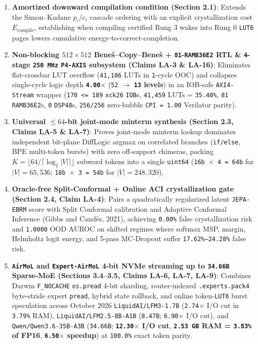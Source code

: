 \documentclass[10pt]{article}
\begin{document}
\begin{enumerate}
  \item \textbf{Amortized downward compilation condition (Section 2.1)}: Extends the Simon--Kadane $p_i / c_i$ cascade ordering with an explicit crystallization cost $E_{\text{compile}}$, establishing when compiling certified Rung 3 wakes into Rung 0 \texttt{LUT6} pages lowers cumulative energy-to-correct-completion.
  \item \textbf{Non-blocking $512 \times 512$ Bene\v{s}--Copy--Bene\v{s} + \texttt{81}-\texttt{RAMB36E2} RTL \& \texttt{4}-stage \texttt{250 MHz} \texttt{P4-AXIS} subsystem (Claims LA-3 \& LA-16)}: Eliminates flat-crossbar LUT overflow (\texttt{41,186} LUTs in \texttt{1}-cycle OOC) and collapses single-cycle logic depth \textbf{\texttt{4.00$\times$}} (\texttt{52} $\to$ \textbf{\texttt{13} levels}) in an IOB-safe \texttt{AXI4-Stream} wrapper (\texttt{170 <= 189} \texttt{xck26} \texttt{IOB}s, \texttt{41,459} LUTs = \texttt{35.40\%}, \texttt{81} \texttt{RAMB36E2}s, \texttt{0} \texttt{DSP48}s, \texttt{256/256} zero-bubble \texttt{CPI = 1.00} Verilator parity).
  \item \textbf{Universal $\le 64$-bit joint-mode minterm synthesis (Section 2.3, Claims LA-5 \& LA-7)}: Proves joint-mode minterm lookup dominates independent bit-plane DiffLogic argmax on correlated branches (\texttt{if/else}, BPE multi-token bursts) with zero off-support chimeras, packing $K = \lfloor 64 / \lceil \log_2 |V| \rceil \rfloor$ subword tokens into a single \texttt{uint64} (\texttt{16b $\times$ 4 = 64b} for $|V|=65{,}536$; \texttt{18b $\times$ 3 = 54b} for $|V|=248{,}320$).
  \item \textbf{Oracle-free Split-Conformal + Online ACI crystallization gate (Section 2.4, Claim LA-4)}: Pairs a quadratically regularized latent \texttt{JEPA-EBRM} score with Split Conformal calibration and Adaptive Conformal Inference (Gibbs and Cand\`es, 2021), achieving \texttt{0.00\%} false crystallization risk and \texttt{1.0000} OOD AUROC on shifted regimes where softmax MSP, margin, Helmholtz logit energy, and 5-pass MC-Dropout suffer \texttt{17.62\%--24.28\%} false risk.
  \item \textbf{\texttt{AirMoL} and \texttt{Expert-AirMoL} 4-bit NVMe streaming up to \texttt{34.66B} Sparse-MoE (Sections 3.4--3.5, Claims LA-6, LA-7, LA-9)}: Combines Darwin \texttt{F\_NOCACHE} \texttt{os.pread} 4-bit sharding, router-indexed \texttt{.experts.pack4} byte-stride expert \texttt{pread}, hybrid state rollback, and online token-\texttt{LUT6} burst speculation across October 2026 \texttt{LiquidAI/LFM3-1.7B} (\texttt{2.74$\times$} I/O cut in \texttt{3.79\%} RAM), \texttt{LiquidAI/LFM2.5-8B-A1B} (\texttt{8.47B}; \texttt{6.90$\times$} I/O cut), and \texttt{Qwen/Qwen3.6-35B-A3B} (\texttt{34.66B}; \textbf{\texttt{12.30$\times$} I/O cut}, \textbf{\texttt{2.53 GB} RAM = \texttt{3.83\%} of FP16}, \textbf{\texttt{6.50$\times$} speedup}) at \texttt{100.0\%} exact token parity.

\end{enumerate}
\end{document}
